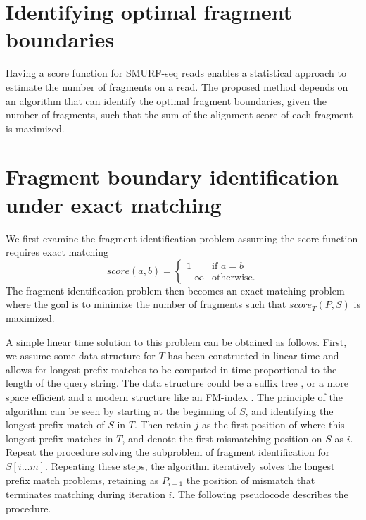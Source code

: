 \section{Identifying optimal fragment boundaries}

Having a score function for SMURF-seq reads enables a statistical
approach to estimate the number of fragments on a read. The proposed
method depends on an algorithm that can identify the optimal fragment
boundaries, given the number of fragments, such that the sum of the
alignment score of each fragment is maximized.

\section{Fragment boundary identification under exact matching}
We first examine the fragment identification problem assuming the score
function requires exact matching
\[score(a,b)=
\begin{cases}
  1 & \text{if } a = b \\
  -\infty & \text{otherwise.}
\end{cases}\]
The fragment identification problem then becomes an exact matching
problem where the goal is to minimize the number of fragments such that
$score_T(P,S)$ is maximized.

A simple linear time solution to this problem can be obtained as
follows. First, we assume some data structure for $T$ has been
constructed in linear time and allows for longest prefix matches to be
computed in time proportional to the length of the query string. The
data structure could be a suffix tree \cite{mccreight1976space}, or a
more space efficient and a modern structure like an FM-index
\cite{ferragina2000opportunistic}. The principle of the algorithm can be
seen by starting at the beginning of $S$, and identifying the longest
prefix match of $S$ in $T$. Then retain $j$ as the first position of
where this longest prefix matches in $T$, and denote the first
mismatching position on $S$ as $i$. Repeat the procedure solving the
subproblem of fragment identification for $S[i\dots m]$. Repeating these
steps, the algorithm iteratively solves the longest prefix match
problems, retaining as $P_{i+1}$ the position of mismatch that
terminates matching during iteration $i$. The following pseudocode
describes the procedure.

